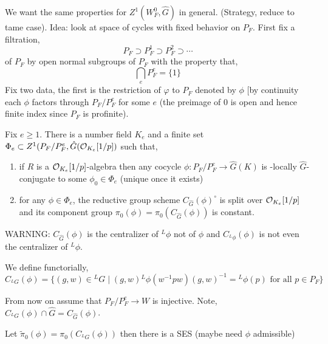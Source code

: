 \documentclass[12pt]{article}
\begin{document}
We want the same properties for $Z^1(W_F^0, \hat{G})$ in general. (Strategy, reduce to tame case). Idea: look at space of cycles with fixed behavior on $P_F$. First fix a filtration,
\[ P_F \supset P_F^1 \supset P_F^2 \supset \cdots \]
of $P_F$ by open normal subgroups of $P_F$ with the property that,
\[ \bigcap_e P_F^e = \{ 1 \} \]
Fix two data, the first is the restriction of $\varphi$ to $P_F$ denoted by $\phi$ [by continuity each $\phi$ factors through $P_F / P_F^e$ for some $e$ (the preimage of $0$ is open and hence finite index since $P_F$ is profinite). 

\begin{theorem}
Fix $e \ge 1$. There is a number field $K_e$ and a finite set $\Phi_e \subset Z^1(P_F / P_F^e, \hat{G}(\mathcal{O}_{K_e}[1/p])$ such that,
\begin{enumerate}
\item if $R$ is a $\mathcal{O}_{K_e}[1/p]$-algebra then any cocycle $\phi : P_F / P_F^e \to \hat{G}(K)$ is \etale-locally $\hat{G}$-conjugate to some $\phi_0 \in \Phi_e$ (unique once it exists)
\item for any $\phi \in \Phi_e$, the reductive group scheme $C_{\hat{G}}(\phi)^\circ$ is split over $\mathcal{O}_{K_e}[1/p]$ and its component group $\pi_0(\phi) = \pi_0(C_{\hat{G}}(\phi))$ is constant. 
\end{enumerate}
\end{theorem}

WARNING: $C_{\hat{G}}(\phi)$ is the centralizer of ${}^L \phi$ not of $\phi$ and $C_{{}^L \phi}(\phi)$ is not even the centralizer of ${}^L \phi$. 

\begin{defn}
We define functorially,
\[ C_{{}^L G}(\phi) = \{ (g, w) \in {}^L G \mid (g, w) {}^L \phi(w^{-1} p w) (g, w)^{-1} = {}^L \phi(p) \text{ for all } p \in P_F \} \]
\end{defn}

\begin{rmk}
From now on assume that $P_F / P_F^e \to W$ is injective. Note, $C_{{}^L G}(\phi) \cap \hat{G} = C_{\hat{G}}(\phi)$. 
\end{rmk}

Let $\tilde{\pi}_0(\phi) = \pi_0(C_{{}^L G}(\phi))$ then there is a SES (maybe need $\phi$ admissible)
\begin{center}
\end{center}
\end{document}
